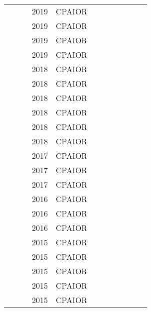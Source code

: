 \documentclass[a4paper]{article}
\begin{document}
{\begin{longtable}{p{3cm}p{6cm}rrcrlcccp{1.5cm}l}
& \href{papers/GeibingerMM19.pdf}{} & \cite{GeibingerMM19} & 2019 & CPAIOR & & & & & & & \\
& \href{papers/MalapertN19.pdf}{} & \cite{MalapertN19} & 2019 & CPAIOR & & & & & & & \\
& \href{papers/BogaerdtW19.pdf}{} & \cite{BogaerdtW19} & 2019 & CPAIOR & & & & & & & \\
& \href{papers/YangSS19.pdf}{} & \cite{YangSS19} & 2019 & CPAIOR & & & & & & & \\
& \href{papers/BenediktSMVH18.pdf}{} & \cite{BenediktSMVH18} & 2018 & CPAIOR & & & & & & & \\
& \href{papers/DemirovicS18.pdf}{} & \cite{DemirovicS18} & 2018 & CPAIOR & & & & & & & \\
& \href{papers/KameugneFGOQ18.pdf}{} & \cite{KameugneFGOQ18} & 2018 & CPAIOR & & & & & & & \\
& \href{papers/Laborie18a.pdf}{} & \cite{Laborie18a} & 2018 & CPAIOR & & & & & & & \\
& \href{papers/OuelletQ18.pdf}{} & \cite{OuelletQ18} & 2018 & CPAIOR & & & & & & & \\
& \href{papers/AstrandJZ18.pdf}{} & \cite{AstrandJZ18} & 2018 & CPAIOR & & & & & & & \\
& \href{papers/CappartS17.pdf}{} & \cite{CappartS17} & 2017 & CPAIOR & & & & & & & \\
& \href{papers/KletzanderM17.pdf}{} & \cite{KletzanderM17} & 2017 & CPAIOR & & & & & & & \\
& \href{papers/GelainPRVW17.pdf}{} & \cite{GelainPRVW17} & 2017 & CPAIOR & & & & & & & \\
& \href{papers/FontaineMH16.pdf}{} & \cite{FontaineMH16} & 2016 & CPAIOR & & & & & & & \\
& \href{papers/HechingH16.pdf}{} & \cite{HechingH16} & 2016 & CPAIOR & & & & & & & \\
& \href{papers/Madi-WambaB16.pdf}{} & \cite{Madi-WambaB16} & 2016 & CPAIOR & & & & & & & \\
& \href{papers/MelgarejoLS15.pdf}{} & \cite{MelgarejoLS15} & 2015 & CPAIOR & & & & & & & \\
& \href{papers/BofillGSV15.pdf}{} & \cite{BofillGSV15} & 2015 & CPAIOR & & & & & & & \\
& \href{papers/BurtLPS15.pdf}{} & \cite{BurtLPS15} & 2015 & CPAIOR & & & & & & & \\
& \href{papers/cpaior-GayHS15.pdf}{} & \cite{cpaior-GayHS15} & 2015 & CPAIOR & & & & & & & \\
& \href{papers/LimBTBB15.pdf}{} & \cite{LimBTBB15} & 2015 & CPAIOR & & & & & & & \\

\end{longtable}}
\end{document}
